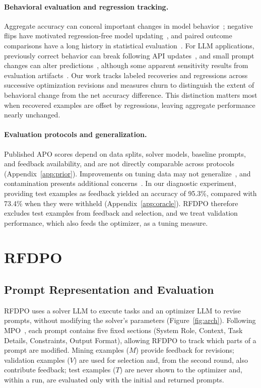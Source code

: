 \documentclass[11pt]{article}
\begin{document}
\paragraph{Behavioral evaluation and regression tracking.}
Aggregate accuracy can conceal important changes in model behavior~\citep{ribeiro2020checklist}; negative flips have motivated regression-free model updating~\citep{yan2021positive}, and paired outcome comparisons have a long history in statistical evaluation~\citep{mcnemar1947sampling}. For LLM applications, previously correct behavior can break following API updates~\citep{ma2024regression}, and small prompt changes can alter predictions~\citep{salinas2024butterfly,sclar2024quantifying,errica2025wrong}, although some apparent sensitivity results from evaluation artifacts~\citep{hua2025flaw}. Our work tracks labeled recoveries and regressions across successive optimization revisions and measures churn to distinguish the extent of behavioral change from the net accuracy difference. This distinction matters most when recovered examples are offset by regressions, leaving aggregate performance nearly unchanged.

\paragraph{Evaluation protocols and generalization.}
Published APO scores depend on data splits, solver models, baseline prompts, and feedback availability, and are not directly comparable across protocols (Appendix~\ref{app:prior}). Improvements on tuning data may not generalize~\citep{recht2019imagenet}, and contamination presents additional concerns~\citep{oren2023proving}. In our diagnostic experiment, providing test examples as feedback yielded an accuracy of 95.3\%, compared with 73.4\% when they were withheld (Appendix~\ref{app:oracle}). RFDPO therefore excludes test examples from feedback and selection, and we treat validation performance, which also feeds the optimizer, as a tuning measure.

\section{RFDPO}
\label{sec:method}

\subsection{Prompt Representation and Evaluation}

RFDPO uses a solver LLM to execute tasks and an optimizer LLM to revise prompts, without modifying the solver's parameters (Figure~\ref{fig:arch}). Following MPO~\citep{sharma2026mpo}, each prompt contains five fixed sections (System Role, Context, Task Details, Constraints, Output Format), allowing RFDPO to track which parts of a prompt are modified. Mining examples ($M$) provide feedback for revisions; validation examples ($V$) are used for selection and, from the second round, also contribute feedback; test examples ($T$) are never shown to the optimizer and, within a run, are evaluated only with the initial and returned prompts.
\end{document}
